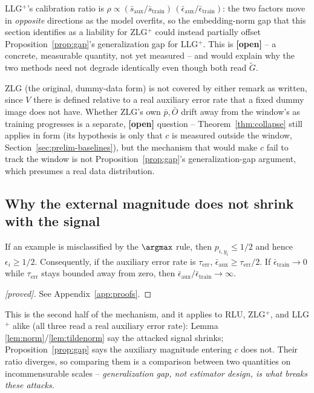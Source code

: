 \begin{remark}
\label{rem:llgp-protect}
LLG$^+$'s calibration ratio is
$\rho \propto (\bar s_{\mathrm{aux}}/\bar s_{\mathrm{train}})\,
(\bar\epsilon_{\mathrm{aux}}/\bar\epsilon_{\mathrm{train}})$: the two
factors move in \emph{opposite} directions as the model overfits, so the
embedding-norm gap that this section identifies as a liability for
ZLG$^+$ could instead partially offset Proposition~\ref{prop:gap}'s
generalization gap for LLG$^+$. This is \textbf{[open]} -- a concrete,
measurable quantity, not yet measured -- and would explain why the two
methods need not degrade identically even though both read $\widetilde
G$.
\end{remark}

ZLG (the original, dummy-data form) is not covered by either remark as
written, since $V$ there is defined relative to a real auxiliary error
rate that a fixed dummy image does not have. Whether ZLG's own $\bar
p,\bar O$ drift away from the window's as training progresses is a
separate, \textbf{[open]} question -- Theorem~\ref{thm:collapse} still
applies in form (its hypothesis is only that $c$ is measured outside the
window, Section~\ref{sec:prelim-baselines}), but the mechanism that would
make $c$ fail to track the window is not Proposition~\ref{prop:gap}'s
generalization-gap argument, which presumes a real data distribution.

\subsection{Why the external magnitude does not shrink with the signal}

\begin{proposition}
\label{prop:gap}
If an example is misclassified by the $\argmax$ rule, then $p_{i,y_i} \le
1/2$ and hence $\epsilon_i \ge 1/2$. Consequently, if the auxiliary error
rate is $\tau_{\mathrm{err}}$, $\bar\epsilon_{\mathrm{aux}} \ge
\tau_{\mathrm{err}}/2$. If $\bar\epsilon_{\mathrm{train}} \to 0$ while
$\tau_{\mathrm{err}}$ stays bounded away from zero, then
$\bar\epsilon_{\mathrm{aux}}/\bar\epsilon_{\mathrm{train}} \to \infty$.
\end{proposition}

\begin{proof}[\textnormal{[proved]}]
See Appendix~\ref{app:proofs}.
\end{proof}

This is the second half of the mechanism, and it applies to RLU, ZLG$^+$,
and LLG$^+$ alike (all three read a real auxiliary error rate): Lemma
\ref{lem:norm}/\ref{lem:tildenorm} say the attacked signal shrinks;
Proposition~\ref{prop:gap} says the auxiliary magnitude entering $c$ does
not. Their ratio diverges, so comparing them is a comparison between two
quantities on incommensurable scales -- \emph{generalization gap, not
estimator design, is what breaks these attacks.}

